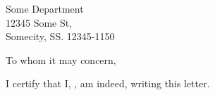 \documentclass{letter}
\begin{document}
\begin{letter}{Some Department\\
12345 Some St,\\
Somecity, SS. 12345-1150}

\opening{To whom it may concern,}

I certify that I, \fromname, am indeed, writing this letter.


\end{letter}
\end{document}
